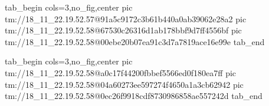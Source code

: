  
 
 
 
 

\qqSecCmtScr


\ifcmt
  tab_begin cols=3,no_fig,center
    pic tm://18_11_22.19.52.57@91a5c9172c3b61b440a0ab39062e28a2
    pic tm://18_11_22.19.52.58@67530c26316d1ab178bbf9d7ff4556bf
    pic tm://18_11_22.19.52.58@00ebe20b07ea91c3d7a7819ace16e99e
  tab_end
\fi


\ifcmt
  tab_begin cols=3,no_fig,center
    pic tm://18_11_22.19.52.58@a0c17f44200fbbef5566ed0f180ea7ff
    pic tm://18_11_22.19.52.58@04a60273ee597274f4650a1a3cb62942
    pic tm://18_11_22.19.52.58@0ec26f9918cdf8730986858ae557242d
  tab_end
\fi

